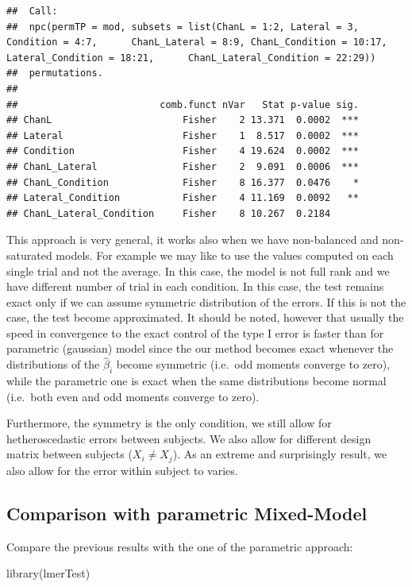 \documentclass[
]{article}
\newenvironment{Shaded}{\begin{snugshade}}{\end{snugshade}}
\newcommand{\FunctionTok}[1]{\textcolor[rgb]{0.00,0.00,0.00}{#1}}
\newcommand{\NormalTok}[1]{#1}
\begin{document}
\begin{verbatim}
##  Call:
##  npc(permTP = mod, subsets = list(ChanL = 1:2, Lateral = 3, Condition = 4:7,      ChanL_Lateral = 8:9, ChanL_Condition = 10:17, Lateral_Condition = 18:21,      ChanL_Lateral_Condition = 22:29)) 
##  permutations.
## 
##                         comb.funct nVar   Stat p-value sig.
## ChanL                       Fisher    2 13.371  0.0002  ***
## Lateral                     Fisher    1  8.517  0.0002  ***
## Condition                   Fisher    4 19.624  0.0002  ***
## ChanL_Lateral               Fisher    2  9.091  0.0006  ***
## ChanL_Condition             Fisher    8 16.377  0.0476    *
## Lateral_Condition           Fisher    4 11.169  0.0092   **
## ChanL_Lateral_Condition     Fisher    8 10.267  0.2184
\end{verbatim}

This approach is very general, it works also when we have non-balanced
and non-saturated models. For example we may like to use the values
computed on each single trial and not the average. In this case, the
model is not full rank and we have different number of trial in each
condition. In this case, the test remains exact only if we can assume
symmetric distribution of the errors. If this is not the case, the test
become approximated. It should be noted, however that usually the speed
in convergence to the exact control of the type I error is faster than
for parametric (gaussian) model since the our method becomes exact
whenever the distributions of the \(\hat\beta_i\) become symmetric
(i.e.~odd moments converge to zero), while the parametric one is exact
when the same distributions become normal (i.e.~both even and odd
moments converge to zero).

Furthermore, the symmetry is the only condition, we still allow for
hetheroscedastic errors between subjects. We also allow for different
design matrix between subjects (\(X_i\neq X_j\)). As an extreme and
surprisingly result, we also allow for the error within subject to
varies.

\hypertarget{comparison-with-parametric-mixed-model}{%
\subsection{Comparison with parametric
Mixed-Model}\label{comparison-with-parametric-mixed-model}}

Compare the previous results with the one of the parametric approach:

\begin{Shaded}
\begin{Highlighting}[]
\FunctionTok{library}\NormalTok{(lmerTest)}
\end{Highlighting}
\end{Shaded}
\end{document}
